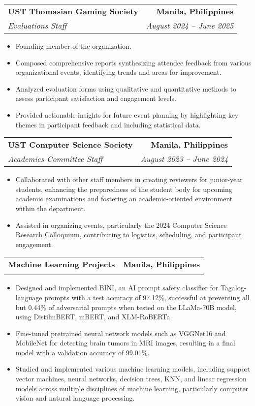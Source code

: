 \documentclass[letterpaper,11pt]{article}
\makeatletter
\newcommand{\resumeItem}[1]{
  \item\small{
    {#1 \vspace{-2pt}}
  }
}
\newcommand{\resumeSubheading}[4]{
  \vspace{-2pt}\item
    \begin{tabular*}{1.0\textwidth}[t]{l@{\extracolsep{\fill}}r}
      \textbf{#1} & \textbf{\small #2} \\
      \textit{\small#3} & \textit{\small #4} \\
    \end{tabular*}\vspace{-7pt}
}
\newcommand{\resumeItemListStart}{\begin{itemize}}
\newcommand{\resumeItemListEnd}{\end{itemize}\vspace{-5pt}}
\makeatother
\begin{document}
    \resumeSubheading
      {UST Thomasian Gaming Society}{Manila, Philippines}
      {Evaluations Staff}{August 2024 -- June 2025}
      \resumeItemListStart
        \resumeItem{Founding member of the organization.}
        \resumeItem{Composed comprehensive reports synthesizing attendee feedback from various organizational events, identifying trends and areas for improvement.}
        \resumeItem{Analyzed evaluation forms using qualitative and quantitative methods to assess participant satisfaction and engagement levels.}
        \resumeItem{Provided actionable insights for future event planning by highlighting key themes in participant feedback and including statistical data.}
      \resumeItemListEnd

    \resumeSubheading
      {UST Computer Science Society}{Manila, Philippines}
      {Academics Committee Staff}{August 2023 -- June 2024}
      \resumeItemListStart
        \resumeItem{Collaborated with other staff members in creating reviewers for junior-year students, enhancing the preparedness of the student body for upcoming academic examinations and fostering an academic-oriented environment within the department.}
        \resumeItem{Assisted in organizing events, particularly the 2024 Computer Science Research Colloquium, contributing to logistics, scheduling, and participant engagement.}
      \resumeItemListEnd

    \resumeSubheading
      {Machine Learning Projects}{Manila, Philippines}
      {}{}
      \resumeItemListStart
        \resumeItem{Designed and implemented BINI, an AI prompt safety classifier for Tagalog-language prompts with a test accuracy of 97.12\%, successful at preventing all but 0.44\% of adversarial prompts when tested on the LLaMa-70B model, using DistilmBERT, mBERT, and XLM-RoBERTa.}
        \resumeItem{Fine-tuned pretrained neural network models such as VGGNet16 and MobileNet for detecting brain tumors in MRI images, resulting in a final model with a validation accuracy of 99.01\%.}
        \resumeItem{Studied and implemented various machine learning models, including support vector machines, neural networks, decision trees, KNN, and linear regression models across multiple disciplines of machine learning, particularly computer vision and natural language processing.}
      \resumeItemListEnd
\end{document}
